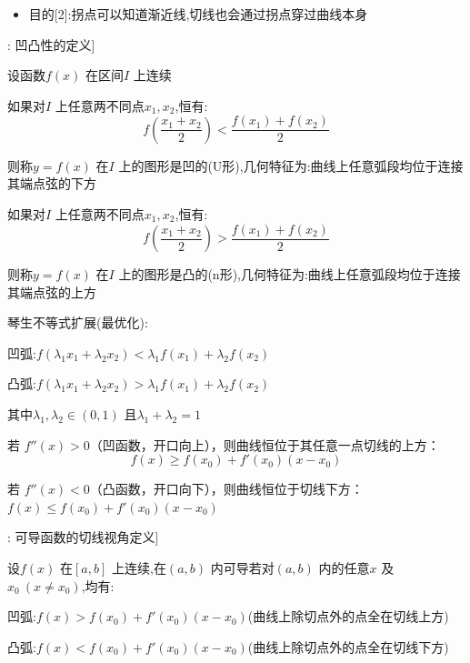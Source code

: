 \documentclass[11pt,a4paper,UTF8]{ctexart}
\begin{document}
\begin{targetbox}[本章复习目标与核心知识图谱]
\begin{itemize}
  \item 目的[2]:拐点可以知道渐近线,切线也会通过拐点穿过曲线本身
\end{itemize}
\end{targetbox}

\begin{thmbox}[原理[1]: 凹凸性的定义]

设函数$f(x)$ 在区间$I$ 上连续

如果对$I$ 上任意两不同点$x_1, x_2$,恒有:
\begin{equation*}
f\left(\frac{x_1 + x_2}{2}\right) < \frac{f(x_1) + f(x_2)}{2}
\end{equation*}


  则称$y = f(x)$ 在$I$ 上的图形是凹的(U形),几何特征为:曲线上任意弧段均位于连接其端点弦的下方

如果对$I$ 上任意两不同点$x_1, x_2$,恒有:
\begin{equation*}
f\left(\frac{x_1 + x_2}{2}\right) > \frac{f(x_1) + f(x_2)}{2}
\end{equation*}


  则称$y = f(x)$ 在$I$ 上的图形是凸的(n形),几何特征为:曲线上任意弧段均位于连接其端点弦的上方

琴生不等式扩展(最优化):

凹弧:$f(\lambda_1 x_1 + \lambda_2 x_2) < \lambda_1 f(x_1) + \lambda_2 f(x_2)$

凸弧:$f(\lambda_1 x_1 + \lambda_2 x_2) > \lambda_1 f(x_1) + \lambda_2 f(x_2)$

其中$\lambda_1, \lambda_2 \in (0, 1)$ 且$\lambda_1 + \lambda_2 = 1$

若 $f''(x) > 0$（凹函数，开口向上），则曲线恒位于其任意一点切线的上方：
\begin{equation*}
f(x) \ge f(x_0) + f'(x_0)(x - x_0)
\end{equation*}


若 $f''(x) < 0$（凸函数，开口向下），则曲线恒位于切线下方：$f(x) \le f(x_0) + f'(x_0)(x - x_0)$

\end{thmbox}
\begin{thmbox}[原理[2]: 可导函数的切线视角定义]

设$f(x)$ 在$[a, b]$ 上连续,在$(a, b)$ 内可导若对$(a, b)$ 内的任意$x$ 及$x_0\ (x \neq x_0)$,均有:

凹弧:$f(x) > f(x_0) + f'(x_0)(x - x_0)$(曲线上除切点外的点全在切线上方)

凸弧:$f(x) < f(x_0) + f'(x_0)(x - x_0)$(曲线上除切点外的点全在切线下方)

\end{thmbox}
\end{document}

